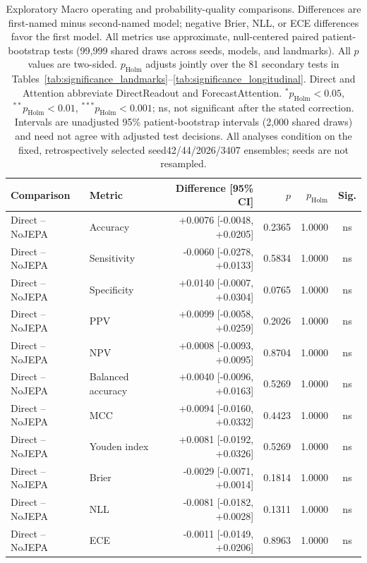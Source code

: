\begin{table}[t]
\centering
\small
\caption{Exploratory Macro operating and probability-quality comparisons. Differences are first-named minus second-named model; negative Brier, NLL, or ECE differences favor the first model. All metrics use approximate, null-centered paired patient-bootstrap tests (99,999 shared draws across seeds, models, and landmarks). All $p$ values are two-sided. $p_{\mathrm{Holm}}$ adjusts jointly over the 81 secondary tests in Tables~\ref{tab:significance_landmarks}--\ref{tab:significance_longitudinal}. Direct and Attention abbreviate DirectReadout and ForecastAttention. $^{*}p_{\mathrm{Holm}}<0.05$, $^{**}p_{\mathrm{Holm}}<0.01$, $^{***}p_{\mathrm{Holm}}<0.001$; ns, not significant after the stated correction. Intervals are unadjusted 95\% patient-bootstrap intervals (2,000 shared draws) and need not agree with adjusted test decisions. All analyses condition on the fixed, retrospectively selected seed42/44/2026/3407 ensembles; seeds are not resampled.}
\label{tab:significance_extended}
\begin{tabular}{llrrrc}
\toprule
Comparison & Metric & Difference [95\% CI] & $p$ & $p_{\mathrm{Holm}}$ & Sig. \\
\midrule
Direct -- NoJEPA & Accuracy & +0.0076 [-0.0048, +0.0205] & 0.2365 & 1.0000 & ns \\
Direct -- NoJEPA & Sensitivity & -0.0060 [-0.0278, +0.0133] & 0.5834 & 1.0000 & ns \\
Direct -- NoJEPA & Specificity & +0.0140 [-0.0007, +0.0304] & 0.0765 & 1.0000 & ns \\
Direct -- NoJEPA & PPV & +0.0099 [-0.0058, +0.0259] & 0.2026 & 1.0000 & ns \\
Direct -- NoJEPA & NPV & +0.0008 [-0.0093, +0.0095] & 0.8704 & 1.0000 & ns \\
Direct -- NoJEPA & Balanced accuracy & +0.0040 [-0.0096, +0.0163] & 0.5269 & 1.0000 & ns \\
Direct -- NoJEPA & MCC & +0.0094 [-0.0160, +0.0332] & 0.4423 & 1.0000 & ns \\
Direct -- NoJEPA & Youden index & +0.0081 [-0.0192, +0.0326] & 0.5269 & 1.0000 & ns \\
Direct -- NoJEPA & Brier & -0.0029 [-0.0071, +0.0014] & 0.1814 & 1.0000 & ns \\
Direct -- NoJEPA & NLL & -0.0081 [-0.0182, +0.0028] & 0.1311 & 1.0000 & ns \\
Direct -- NoJEPA & ECE & -0.0011 [-0.0149, +0.0206] & 0.8963 & 1.0000 & ns \\

\end{tabular}
\end{table}
